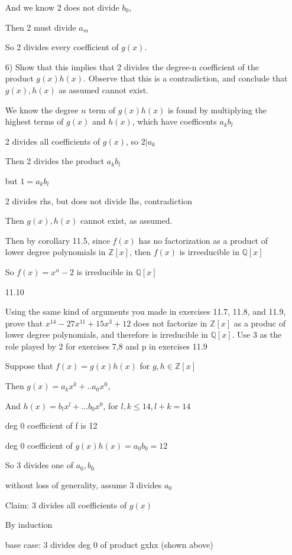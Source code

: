 \documentclass[12pt]{article}
\begin{document}
\begin{itemize}
And we know 2 does not divide $b_0$, 

Then 2 must divide $a_m$

So 2 divides every coefficient of $g(x)$. 

6) Show that this implies that 2 divides the degree-n coefficient of the product $g(x)h(x)$. Observe that this is a contradiction, and conclude that $g(x), h(x)$ as assumed cannot exist.

We know the degree $n$ term of $g(x)h(x)$ is found by multiplying the highest terms of $g(x)$ and $h(x)$, which have coefficents $a_k b_l$

2 divides all coefficients of $g(x)$, so $2 | a_k$

Then 2 divides the product $a_k b_l$

but $1 = a_k b_l$

2 divides rhs, but does not divide lhs, contradiction

Then $g(x),h(x)$ cannot exist, as assumed.

Then by corollary 11.5, since $f(x)$ has no factorization as a product of lower degree polynomials in $\mathbb{Z}[x]$, then $f(x)$ is irreeducible in $\mathbb{Q}[x]$

So $f(x) = x^n - 2$ is irreducible in $\mathbb{Q}[x]$

\newpage
\item[11.10]

	Using the same kind of arguments you made in exercises 11.7, 11.8, and 11.9, prove that $x^{14} - 27x^{11} + 15x^3 + 12$ does not factorize in $\mathbb{Z}[x]$ as a produc of lower degree polynomials, and therefore is irreducible in $\mathbb{Q}[x]$. Use 3 as the role played by 2 for exercises 7,8 and p in exercises 11.9

	Suppose that $f(x) = g(x)h(x)$ for $g,h \in\mathbb{Z}[x]$

	Then $g(x) = a_k x^k + .. a_0 x^0$,

	And $h(x) = b_l x^l + ... b_0 x^0$, for $l,k \leq 14, l + k = 14$

	deg 0 coefficient of f is 12

	deg 0 coefficient of $g(x)h(x) = a_0 b_0 = 12$

	So 3 divides one of $a_0, b_0$

	without loss of generality, assume 3 divides $a_0$

	Claim: 3 divides all coefficients of $g(x)$

	By induction

	base case: 3 divides deg 0 of product gxhx (shown above)


\end{itemize}
\end{document}
